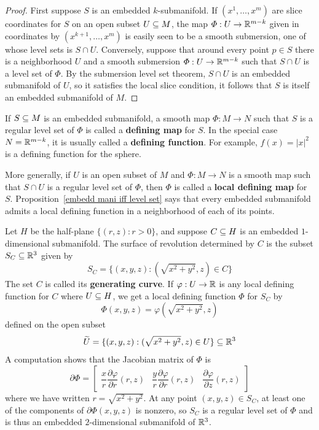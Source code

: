 \begin{proof}
First suppose $S$ is an embedded $k$-submanifold. If $(x^1,\dots,x^m)$ are slice coordinates for $S$ on an open subset $U\subseteq M$, the map $\varPhi:U\to\mathbb{R}^{m-k}$ given in coordinates by $(x^{k+1},\dots,x^m)$ is easily seen to be a smooth submersion, one of whose level sets is $S\cap U$. Conversely, suppose that around every point $p\in S$ there is a neighborhood $U$ and a smooth submersion $\varPhi:U\to\mathbb{R}^{m-k}$ such that $S\cap U$ is a level set of $\varPhi$. By the submersion level set theorem, $S\cap U$ is an embedded submanifold of $U$, so it satisfies the local slice condition, it follows that $S$ is itself an embedded submanifold of $M$.
\end{proof}
If $S\subseteq M$ is an embedded submanifold, a smooth map $\varPhi:M\to N$ such that $S$ is a regular level set of $\varPhi$ is called a \textbf{defining map} for $S$. In the special case $N=\mathbb{R}^{m-k}$, it is usually called a \textbf{defining function}. For example, $f(x)=|x|^2$ is a defining function for the sphere.\par More generally, if $U$ is an open subset of $M$ and $\varPhi:M\to N$ is a smooth
map such that $S\cap U$ is a regular level set of $\varPhi$, then $\varPhi$ is called a \textbf{local defining map} for $S$. Proposition~\ref{embedd mani iff level set} says that every embedded submanifold admits a local defining function in a neighborhood of each of its points.
\begin{example}\label{surfaces of revolution}
Let $H$ be the half-plane $\{(r,z):r>0\}$, and suppose $C\subseteq H$ is an embedded $1$-dimensional submanifold. The surface of revolution determined by $C$ is the subset $S_C\subseteq\mathbb{R}^3$ given by
\[S_C=\{(x,y,z):(\sqrt{x^2+y^2},z)\in C\}\]
The set $C$ is called its \textbf{generating curve}. If $\varphi:U\to\mathbb{R}$ is any local defining function for $C$ where $U\subseteq H$, we get a local defining function $\varPhi$ for $S_C$ by
\[\varPhi(x,y,z)=\varphi(\sqrt{x^2+y^2},z)\]
defined on the open subset
\[\widetilde{U}=\{(x,y,z):(\sqrt{x^2+y^2},z)\in U\}\subseteq\mathbb{R}^3\]
A computation shows that the Jacobian matrix of $\varPhi$ is
\[\partial\varPhi=\begin{bmatrix}
\dfrac{x}{r}\dfrac{\partial\varphi}{\partial r}(r,z)&\dfrac{y}{r}\dfrac{\partial\varphi}{\partial r}(r,z)&\dfrac{\partial\varphi}{\partial z}(r,z)
\end{bmatrix}\]
where we have written $r=\sqrt{x^2+y^2}$. At any point $(x,y,z)\in S_C$, at least one of the components of $\partial\varPhi(x,y,z)$ is nonzero, so $S_C$ is a regular level set of $\varPhi$ and is thus an embedded $2$-dimensional submanifold of $\mathbb{R}^3$.
\end{example}
